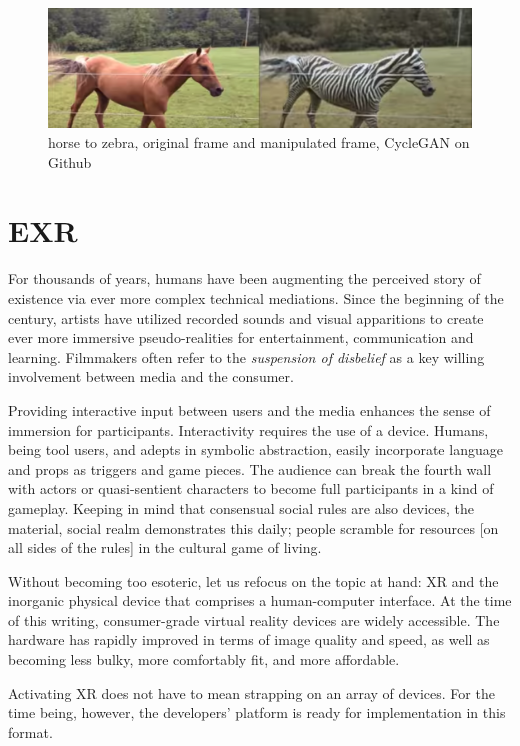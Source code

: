 \documentclass{UIdahoMastersThesis}
\begin{document}
\begin{figure}[h!]
	\centering
	\includegraphics[width=0.81\linewidth]{gan.png}
	\caption{horse to zebra, original frame and manipulated frame, CycleGAN on Github}
	\label{fig:gan}
\end{figure}


\section{EXR}

For thousands of years, humans have been augmenting the perceived story of existence via ever more complex technical mediations. Since the beginning of the  century, artists have utilized recorded sounds and visual apparitions to create ever more immersive pseudo-realities for entertainment, communication and learning. Filmmakers often refer to the \emph{suspension of disbelief} as a key willing involvement between media and the consumer. 

Providing interactive input between users and the media enhances the sense of immersion for participants. Interactivity requires the use of a device. Humans, being tool users, and adepts in symbolic abstraction, easily incorporate language and props as triggers and game pieces. The audience can break the fourth wall with actors or quasi-sentient characters to become full participants in a kind of gameplay. Keeping in mind that consensual social rules are also devices, the material, social realm demonstrates this daily; people scramble for resources [on all sides of the rules] in the cultural game of living.

Without becoming too esoteric, let us refocus on the topic at hand: XR and the inorganic physical device that comprises a human-computer interface. At the time of this writing, consumer-grade virtual reality devices are widely accessible. The hardware has rapidly improved in terms of image quality and speed, as well as becoming less bulky, more comfortably fit, and more affordable.

Activating \ac{XR} does not have to mean strapping on an array of devices. For the time being, however, the developers' platform is ready for implementation in this format.
\end{document}
